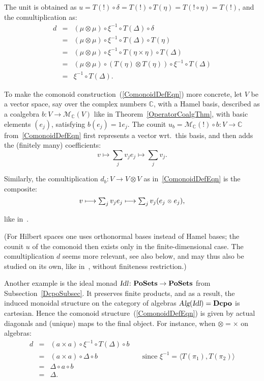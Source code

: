 \documentclass{LMCS}
\newcommand{\after}{\mathrel{\circ}}
\newcommand{\Cat}[1]{\ensuremath{\mathbf{#1}}}
\newcommand{\Alg}{\textsl{Alg}\xspace}
\newcommand{\Idl}{\textsl{Idl}\xspace}
\newcommand{\Mlt}{\ensuremath{\mathcal{M}}}
\newcommand{\PoSets}{\Cat{PoSets}\xspace}
\newcommand{\sotimes}{\mathrel{\raisebox{.05pc}{$\scriptstyle \otimes$}}}
\newcommand{\tuple}[1]{\ensuremath{\langle #1 \rangle}}
\begin{document}
{The unit is obtained as $u = T(!) \after \delta = T(!) \after T(\eta)
= T(! \after \eta) = T(!)$, and the comultiplication as:
$$\begin{array}{rcl}
d
& = &
(\mu \otimes\mu) \after \xi^{-1} \after T(\Delta) \after \delta \\
& = &
(\mu \otimes\mu) \after \xi^{-1} \after T(\Delta) \after T(\eta) \\
& = &
(\mu \otimes\mu) \after \xi^{-1} \after T(\eta\times\eta) \after T(\Delta) \\
& = &
(\mu \otimes\mu) \after (T(\eta)\otimes T(\eta)) \after \xi^{-1} \after 
   T(\Delta) \\
& = &
\xi^{-1} \after T(\Delta).
\end{array}$$
}


\begin{exa}
\label{ComonoidEx}
To make the comonoid construction~(\ref{ComonoidDefEqn}) more
concrete, let $V$ be a vector space, say over the complex numbers
$\mathbb{C}$, with a Hamel basis, described as a coalgebra $b\colon
V\rightarrow \Mlt_{\mathbb{C}}(V)$ like in
Theorem~\ref{OperatorCoalgThm}, with basic elements $(e_{j})$,
satisfying $b(e_{j}) = 1e_{j}$. The counit $u_{b} =
\Mlt_{\mathbb{C}}(!)  \after b \colon V\rightarrow \mathbb{C}$
from~\eqref{ComonoidDefEqn} first represents a vector wrt.\ this
basis, and then adds the (finitely many) coefficients:
$$\textstyle v
\longmapsto
\sum_{j}v_{j}e_{j}
\longmapsto
\sum_{j}v_{j}.$$ 

\noindent Similarly, the comultiplication $d_{b} \colon V \rightarrow
V\otimes V$ as in~\eqref{ComonoidDefEqn} is the composite:
$$\textstyle v
\longmapsto
\sum_{j}v_{j}e_{j}
\longmapsto
\sum_{j}v_{j}(e_{j}\sotimes e_{j}),$$

\noindent like in~\cite{CoeckePV12}. 

(For Hilbert spaces one uses orthonormal bases instead of Hamel bases;
the counit $u$ of the comonoid then exists only in the
finite-dimensional case. The comultiplication $d$ seems more relevant,
see also below, and may thus also be studied on its own, like
in~\cite{AbramskyH12}, without finiteness restriction.)



Another example is the ideal monad $\Idl\colon\PoSets \rightarrow
\PoSets$ from Subsection~\ref{DcpoSubsec}. It preserves finite
products, and as a result, the induced monoidal structure on the
category of algebras $\Alg(\Idl) = \Cat{Dcpo}$ is cartesian. Hence the
comonoid structure~(\ref{ComonoidDefEqn}) is given by actual diagonals
and (unique) maps to the final object. For instance, when $\otimes =
\times$ on algebras:
$$\begin{array}{rcll}
d
& = &
(a\times a) \after \xi^{-1} \after T(\Delta) \after b \\
& = &
(a\times a) \after \Delta \after b &
   \quad \mbox{since } \xi^{-1} = \tuple{T(\pi_{1}), T(\pi_{2})} \\
& = &
\Delta \after a \after b \\
& = &
\Delta.
\end{array}$$
\end{exa}
\end{document}
